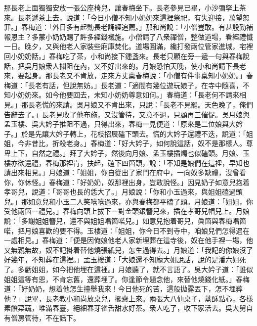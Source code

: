 那長老上面獨獨安放一張公座椅兒，讓春梅坐下。長老參見已畢，小沙彌拏上茶來。長老遞茶上去，說道：「今日小僧不知小奶奶來這裡祭祀，有失迎接，萬望恕罪。」春梅道：「外日多有起動長老誦經追薦。」那和尚說：「小僧豈敢。有甚殷勤補報恩主？多蒙小奶奶賜了許多經錢襯施。小僧請了八衆禪僧，整做道場，看經禮懺一日。晚夕，又與他老人家裝些廂庫焚化。道場圓滿，纔打發兩位管家進城，宅裡回小奶奶話。」春梅吃了茶，小和尚接下鍾盞來。長老只顧在旁一遞一句與春梅說話，把吳月娘衆人攔阻在內，又不好出來的。月娘恐怕天晚，使小和尚請下長老來，要起身。那長老又不肯放，走來方丈稟春梅說：「小僧有件事稟知小奶奶。」春梅道：「長老有話，但說無妨。」長老道：「適間有幾位遊玩娘子，在寺中隨喜，不知小奶奶來。如今他要回去，未知小奶奶尊意如何。」春梅道：「長老何不請來相見。」那長老慌的來請。吳月娘又不肯出來，只說：「長老不見罷。天色晚了，俺們告辭去了。」{}長老見收了他布施，又沒管待，又意不過，只顧再三催促。吳月娘與孟玉樓、吳大妗子推阻不過，只得出來，春梅一見便道：「原來是二位娘與大妗子。」於是先讓大妗子轉上，花枝招展磕下頭去。慌的大妗子還禮不迭，說道：「姐姐，今非昔比，折殺老身。」春梅道：「好大妗子，如何說這話，奴不是那樣人。{}尊卑上下，自然之禮。」拜了大妗子，然後向月娘、孟玉樓插燭也似磕頭。月娘、玉樓亦欲還禮，春梅那裡肯，扶起，磕下四箇頭，說：「不知是娘們在這裡，早知也請出來相見。」月娘道：「姐姐，你自從出了家門在府中，一向奴多缺禮，沒曾看你，你休怪。」{}春梅道：「好奶奶，奴那裡出身，豈敢說怪。」{}因見奶子如意兒抱着孝哥兒，說道：「哥哥也長的恁大了。」月娘說：「你和小玉過來，與姐姐磕過頭兒。」那如意兒和小玉二人笑嘻嘻過來，亦與春梅都平磕了頭。月娘道：「姐姐，你受他兩箇一禮兒。」春梅向頭上拔下一對金頭銀簪兒來，插在孝哥兒帽兒上。月娘說：「多謝姐姐簪兒，還不與姐姐唱箇喏兒。」如意兒抱着哥兒，眞箇與春梅唱箇喏，把月娘喜歡的要不得。玉樓道：「姐姐，你今日不到寺中，咱娘兒們怎得遇在一處相見。」春梅道：「便是因俺娘他老人家新埋葬在這寺後，奴在他手裡一場，他又無親無故，奴不記掛着替他燒張紙兒，怎生過得去。」月娘道：「我記的你娘沒了好幾年，不知葬在這裡。」{}孟玉樓道：「大娘還不知龐大姐說話，說的是潘六姐死了。多虧姐姐，如今把他埋在這裡。」月娘聽了，就不言語了。吳大妗子道：「誰似姐姐這等有恩，不肯忘舊，還葬埋了。{}你逢節令題念他，來替他燒錢化紙。」春梅道：「好奶奶，想着他怎生擡舉我來！今日他死的苦，這般拋露丟下，怎不埋葬他？」{}說畢，長老教小和尚放桌兒，擺齋上來。兩張大八仙桌子，蒸酥點心，各樣素饌菜蔬，堆滿春臺，絕細春芽雀舌甜水好茶。衆人吃了，收下家活去。吳大舅自有僧房管待，不在話下。

